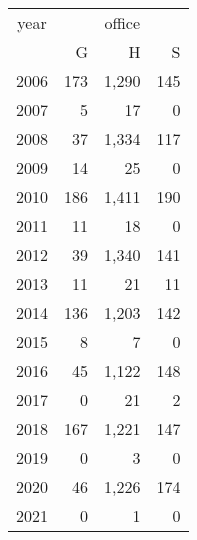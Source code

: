 \footnotesize\begin{tabular}[t]{lrrr}
\toprule
\multicolumn{1}{c}{year} & \multicolumn{3}{c}{office} \\
\cmidrule(l{3pt}r{3pt}){1-1} \cmidrule(l{3pt}r{3pt}){2-4}
  & G & H & S\\
\midrule
2006 & 173 & 1,290 & 145\\
2007 & 5 & 17 & 0\\
2008 & 37 & 1,334 & 117\\
2009 & 14 & 25 & 0\\
2010 & 186 & 1,411 & 190\\
2011 & 11 & 18 & 0\\
2012 & 39 & 1,340 & 141\\
2013 & 11 & 21 & 11\\
2014 & 136 & 1,203 & 142\\
2015 & 8 & 7 & 0\\
2016 & 45 & 1,122 & 148\\
2017 & 0 & 21 & 2\\
2018 & 167 & 1,221 & 147\\
2019 & 0 & 3 & 0\\
2020 & 46 & 1,226 & 174\\
2021 & 0 & 1 & 0\\
\bottomrule
\end{tabular}
